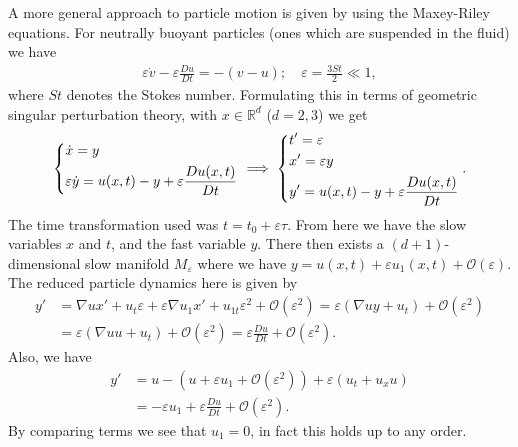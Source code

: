 \begin{ex}
A more general approach to particle motion is given by \cite{Sapsis2008} using the Maxey-Riley equations. For neutrally buoyant particles (ones which are suspended in the fluid) we have
\begin{align}
	\varepsilon \dot{v} - \varepsilon \frac{Du}{Dt} = -(v-u);\quad \varepsilon = \frac{3St}{2}\ll 1, \label{eq9:maxeyriley}	
\end{align}
where $St$ denotes the Stokes number. Formulating this in terms of geometric singular perturbation theory, with $x \in \mathbb{R}^{d}$ ($d=2,3$) we get
\begin{align}
	\begin{dcases}
		\dot{x} = y\\
		\varepsilon \dot{y} = u(x,t) - y + \varepsilon \frac{Du(x,t)}{Dt}	
	\end{dcases}
\implies
\begin{dcases}
	t' = \varepsilon \\
	x' = \varepsilon y \\
	y' = u(x,t) - y + \varepsilon \frac{Du(x,t)}{Dt}
\end{dcases}
.
\end{align}
The time transformation used was $t = t_0 + \varepsilon \tau$. From here we have the slow variables $x$ and $t$, and the fast variable $y$. There then exists a $(d+1)$-dimensional slow manifold $M_\varepsilon$ where we have $y = u(x,t) + \varepsilon u_1(x,t) + \mathcal{O}(\varepsilon)$. The reduced particle dynamics here is given by
\begin{align}
	y' &= \nabla u x' + u_t \varepsilon + \varepsilon \nabla u_1 x' + u_{1t}\varepsilon^{2} + \mathcal{O}(\varepsilon^{2}) 
	= \varepsilon(\nabla uy + u_{t}) + \mathcal{O}(\varepsilon^{2}) \\
	   &= \varepsilon (\nabla u u + u_{t}) + \mathcal{O}(\varepsilon^{2}) 
	   = \varepsilon \frac{Du}{Dt} + \mathcal{O}(\varepsilon^{2}).
\end{align}
Also, we have 
\begin{align}
	y' &= u - \left( u + \varepsilon u_{1} + \mathcal{O}(\varepsilon^{2}) \right) + \varepsilon \left( u_{t} + u_{x}u \right) \\
	   &=-\varepsilon u_{1} + \varepsilon \frac{Du}{Dt} + \mathcal{O}(\varepsilon^{2}).
\end{align}
By  comparing terms we see that $u_{1} =0$, in fact this holds up to any order. 


\end{ex}
